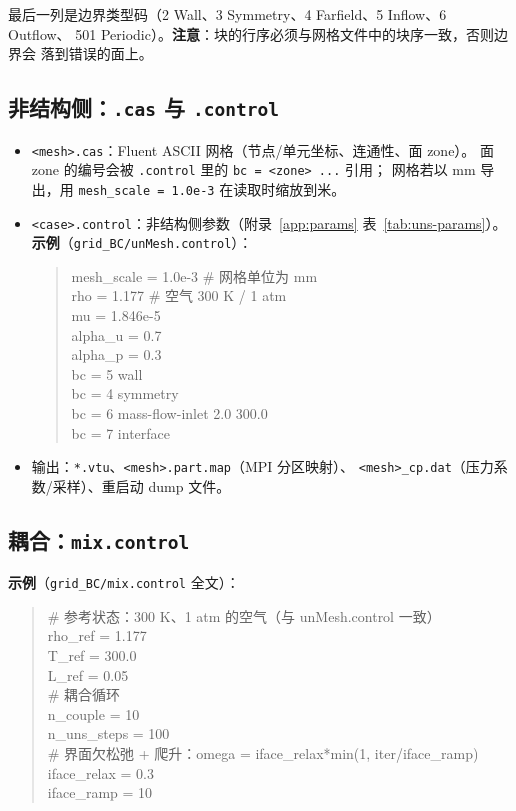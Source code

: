 \documentclass[11pt,a4paper]{ctexart}
\begin{document}
最后一列是边界类型码（2 Wall、3 Symmetry、4 Farfield、5 Inflow、6 Outflow、
501 Periodic）。\textbf{注意}：块的行序必须与网格文件中的块序一致，否则边界会
落到错误的面上。

\subsection{非结构侧：\texttt{.cas} 与 \texttt{.control}}

\begin{itemize}\itemsep2pt
  \item \texttt{<mesh>.cas}：Fluent ASCII 网格（节点/单元坐标、连通性、面 zone）。
        面 zone 的编号会被 \texttt{.control} 里的 \texttt{bc = <zone> ...} 引用；
        网格若以 mm 导出，用 \texttt{mesh\_scale = 1.0e-3} 在读取时缩放到米。
  \item \texttt{<case>.control}：非结构侧参数（附录~\ref{app:params}
        表~\ref{tab:uns-params}）。\textbf{示例}（\texttt{grid\_BC/unMesh.control}）：
\begin{quote}\ttfamily\small
mesh\_scale = 1.0e-3 \# 网格单位为 mm \\
rho = 1.177 \# 空气 300 K / 1 atm \\
mu = 1.846e-5 \\
alpha\_u = 0.7 \\
alpha\_p = 0.3 \\
bc = 5 wall \\
bc = 4 symmetry \\
bc = 6 mass-flow-inlet 2.0 300.0 \\
bc = 7 interface
\end{quote}
  \item 输出：\texttt{*.vtu}、\texttt{<mesh>.part.map}（MPI 分区映射）、
        \texttt{<mesh>\_cp.dat}（压力系数/采样）、重启动 dump 文件。
\end{itemize}

\subsection{耦合：\texttt{mix.control}}

\textbf{示例}（\texttt{grid\_BC/mix.control} 全文）：

\begin{quote}\ttfamily\small
\# 参考状态：300 K、1 atm 的空气（与 unMesh.control 一致）\\
rho\_ref = 1.177 \\
T\_ref   = 300.0 \\
L\_ref   = 0.05 \\
\# 耦合循环 \\
n\_couple    = 10 \\
n\_uns\_steps = 100 \\
\# 界面欠松弛 + 爬升：omega = iface\_relax*min(1, iter/iface\_ramp) \\
iface\_relax = 0.3 \\
iface\_ramp  = 10
\end{quote}
\end{document}
